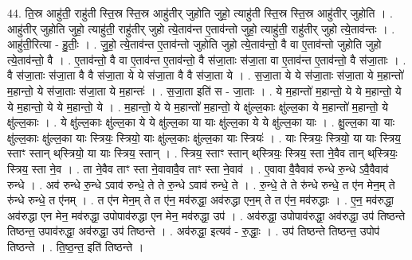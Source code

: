 \documentclass[17pt]{extarticle}
\begin{document}
44. ति॒स्र आहु॑ती॒ राहु॑ती स्ति॒स्र स्ति॒स्र आहु॑तीर् जुहोति जुहो॒ त्याहु॑ती स्ति॒स्र स्ति॒स्र आहु॑तीर् जुहोति । . आहु॑तीर् जुहोति जुहो॒ त्याहु॑ती॒ राहु॑तीर् जुहो त्ये॒ताव॑न्त ए॒ताव॑न्तो जुहो॒ त्याहु॑ती॒ राहु॑तीर् जुहो त्ये॒ताव॑न्तः । . आहु॑ती॒रित्या - हु॒तीः॒ । . जु॒हो॒ त्ये॒ताव॑न्त ए॒ताव॑न्तो जुहोति जुहो त्ये॒ताव॑न्तो॒ वै वा ए॒ताव॑न्तो जुहोति जुहो त्ये॒ताव॑न्तो॒ वै । . ए॒ताव॑न्तो॒ वै वा ए॒ताव॑न्त ए॒ताव॑न्तो॒ वै स॑जा॒ताः स॑जा॒ता वा ए॒ताव॑न्त ए॒ताव॑न्तो॒ वै स॑जा॒ताः । . वै स॑जा॒ताः स॑जा॒ता वै वै स॑जा॒ता ये ये स॑जा॒ता वै वै स॑जा॒ता ये । . स॒जा॒ता ये ये स॑जा॒ताः स॑जा॒ता ये म॒हान्तो॑ म॒हान्तो॒ ये स॑जा॒ताः स॑जा॒ता ये म॒हान्तः॑ । . स॒जा॒ता इति॑ स - जा॒ताः । . ये म॒हान्तो॑ म॒हान्तो॒ ये ये म॒हान्तो॒ ये ये म॒हान्तो॒ ये ये म॒हान्तो॒ ये । . म॒हान्तो॒ ये ये म॒हान्तो॑ म॒हान्तो॒ ये क्षु॑ल्ल॒काः क्षु॑ल्ल॒का ये म॒हान्तो॑ म॒हान्तो॒ ये क्षु॑ल्ल॒काः । . ये क्षु॑ल्ल॒काः क्षु॑ल्ल॒का ये ये क्षु॑ल्ल॒का या याः क्षु॑ल्ल॒का ये ये क्षु॑ल्ल॒का याः । . क्षु॒ल्ल॒का या याः क्षु॑ल्ल॒काः क्षु॑ल्ल॒का याः स्त्रियः॒ स्त्रियो॒ याः क्षु॑ल्ल॒काः क्षु॑ल्ल॒का याः स्त्रियः॑ । . याः स्त्रियः॒ स्त्रियो॒ या याः स्त्रिय॒ स्ताꣳ स्तान् थ्‌स्त्रियो॒ या याः स्त्रिय॒ स्तान् । . स्त्रिय॒ स्ताꣳ स्तान् थ्‌स्त्रियः॒ स्त्रिय॒ स्ता ने॒वैव तान् थ्‌स्त्रियः॒ स्त्रिय॒ स्ता ने॒व । . ता ने॒वैव ताꣳ स्ता ने॒वावावै॒व ताꣳ स्ता ने॒वाव॑ । . ए॒वावा वै॒वैवाव॑ रुन्धे रु॒न्धे ऽवै॒वैवाव॑ रुन्धे । . अव॑ रुन्धे रु॒न्धे ऽवाव॑ रुन्धे॒ ते ते रु॒न्धे ऽवाव॑ रुन्धे॒ ते । . रु॒न्धे॒ ते ते रु॑न्धे रुन्धे॒ त ए॑न मेन॒म् ते रु॑न्धे रुन्धे॒ त ए॑नम् । . त ए॑न मेन॒म् ते त ए॑न॒ मव॑रुद्धा॒ अव॑रुद्धा एन॒म् ते त ए॑न॒ मव॑रुद्धाः । . ए॒न॒ मव॑रुद्धा॒ अव॑रुद्धा एन मेन॒ मव॑रुद्धा॒ उपोपाव॑रुद्धा एन मेन॒ मव॑रुद्धा॒ उप॑ । . अव॑रुद्धा॒ उपोपाव॑रुद्धा॒ अव॑रुद्धा॒ उप॑ तिष्ठन्ते तिष्ठन्त॒ उपाव॑रुद्धा॒ अव॑रुद्धा॒ उप॑ तिष्ठन्ते । . अव॑रुद्धा॒ इत्यव॑ - रु॒द्धाः॒ । . उप॑ तिष्ठन्ते तिष्ठन्त॒ उपोप॑ तिष्ठन्ते । . ति॒ष्ठ॒न्त॒ इति॑ तिष्ठन्ते । \newline
\pagebreak
{}
\end{document}
